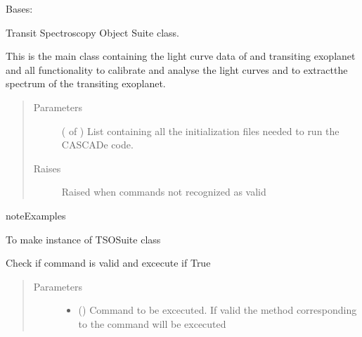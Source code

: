 \documentclass[a4paper,10pt,english]{sphinxmanual}
\begin{document}
\begin{fulllineitems}
\label{\detokenize{cascade.TSO:cascade.TSO.TSO.TSOSuite}}
Bases: 

Transit Spectroscopy Object Suite class.

This is the main class containing the light curve data of and transiting
exoplanet and all functionality to calibrate and analyse the light curves
and to extractthe spectrum of the transiting exoplanet.
\begin{quote}\begin{description}
\item[{Parameters}] \leavevmode
{} ( of ) \textendash{} List containing all the initialization files needed to run the
CASCADe code.

\item[{Raises}] \leavevmode
{} \textendash{} Raised when commands not recognized as valid

\end{description}\end{quote}

\begin{sphinxadmonition}{note}{Examples}

To make instance of TSOSuite class

%
\begin{sphinxVerbatim}[commandchars=\\\{\}]
  
\end{sphinxVerbatim}
\end{sphinxadmonition}

\begin{fulllineitems}
\label{\detokenize{cascade.TSO:cascade.TSO.TSO.TSOSuite.execute}}
Check if command is valid and excecute if True
\begin{quote}\begin{description}
\item[{Parameters}] \leavevmode\begin{itemize}
\item {} 
 () \textendash{} Command to be excecuted. If valid the method corresponding
to the command will be excecuted


\end{itemize}
\end{description}
\end{quote}
\end{fulllineitems}
\end{fulllineitems}
\end{document}
